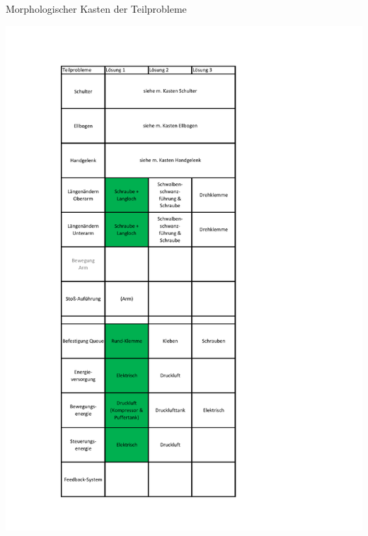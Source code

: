 	\begin{table}[h]
		\centering
		\caption[Morphologischer Kasten der Teilprobleme]{Morphologischer Kasten der Teilprobleme}
		\centering
		\includegraphics[width=\textwidth]{"Abb/Morphologischer Kasten Teilprobleme"}
		\label{fig:morphologische-kasten-teilprobleme}
	\end{table}

